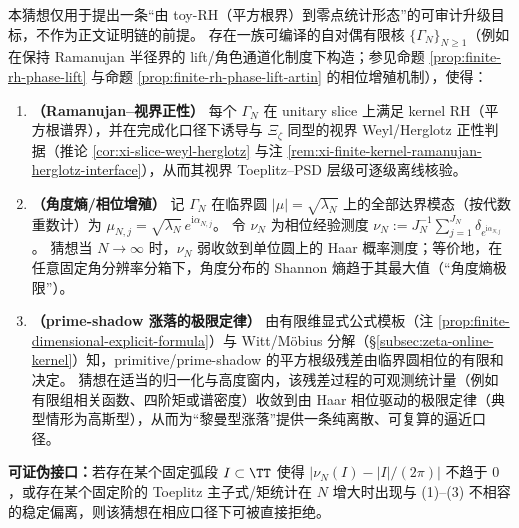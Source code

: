 \begin{conjecture}\label{conj:discussion-horizon-angle-entropy}
本猜想仅用于提出一条“由 toy-RH（平方根界）到零点统计形态”的可审计升级目标，不作为正文证明链的前提。
存在一族可编译的自对偶有限核 \(\{\Gamma_N\}_{N\ge 1}\)（例如在保持 Ramanujan 半径界的 lift/角色通道化制度下构造；参见命题 \ref{prop:finite-rh-phase-lift} 与命题 \ref{prop:finite-rh-phase-lift-artin} 的相位增殖机制），使得：
\begin{enumerate}
  \item \textbf{（Ramanujan--视界正性）}
  每个 \(\Gamma_N\) 在 unitary slice 上满足 kernel RH（平方根谱界），并在完成化口径下诱导与 \(\Xi_\zeta\) 同型的视界 Weyl/Herglotz 正性判据（推论 \ref{cor:xi-slice-weyl-herglotz} 与注 \ref{rem:xi-finite-kernel-ramanujan-herglotz-interface}），从而其视界 Toeplitz--PSD 层级可逐级离线核验。
  \item \textbf{（角度熵/相位增殖）}
  记 \(\Gamma_N\) 在临界圆 \(|\mu|=\sqrt{\lambda_N}\) 上的全部达界模态（按代数重数计）为
  \(
  \mu_{N,j}=\sqrt{\lambda_N}\,e^{\mathrm{i}\alpha_{N,j}}
  \)。
  令 \(\nu_N\) 为相位经验测度
  \(
  \nu_N:=J_N^{-1}\sum_{j=1}^{J_N}\delta_{e^{\mathrm{i}\alpha_{N,j}}}
  \)。
  猜想当 \(N\to\infty\) 时，\(\nu_N\) 弱收敛到单位圆上的 Haar 概率测度；等价地，在任意固定角分辨率分箱下，角度分布的 Shannon 熵趋于其最大值（“角度熵极限”）。
  \item \textbf{（prime-shadow 涨落的极限定律）}
  由有限维显式公式模板（注 \ref{prop:finite-dimensional-explicit-formula}）与 Witt/M\"obius 分解（\S\ref{subsec:zeta-online-kernel}）知，primitive/prime-shadow 的平方根级残差由临界圆相位的有限和决定。
  猜想在适当的归一化与高度窗内，该残差过程的可观测统计量（例如有限组相关函数、四阶矩或谱密度）收敛到由 Haar 相位驱动的极限定律（典型情形为高斯型），从而为“黎曼型涨落”提供一条纯离散、可复算的逼近口径。
\end{enumerate}
\textbf{可证伪接口：}若存在某个固定弧段 \(I\subset\TT\) 使得
\(
|\nu_N(I)-|I|/(2\pi)|
\)
不趋于 \(0\)，或存在某个固定阶的 Toeplitz 主子式/矩统计在 \(N\) 增大时出现与 (1)--(3) 不相容的稳定偏离，则该猜想在相应口径下可被直接拒绝。
\end{conjecture}

